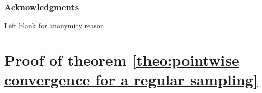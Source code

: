 \documentclass{article} %
\begin{document}
\subsubsection*{Acknowledgments}
Left blank for anonymity reason.





\newpage
{\LARGE {}}
\appendix

\section{Proof of theorem \ref{theo:pointwise convergence for a regular sampling}}\label{sec: appendix: proof of theorem}
\end{document}
